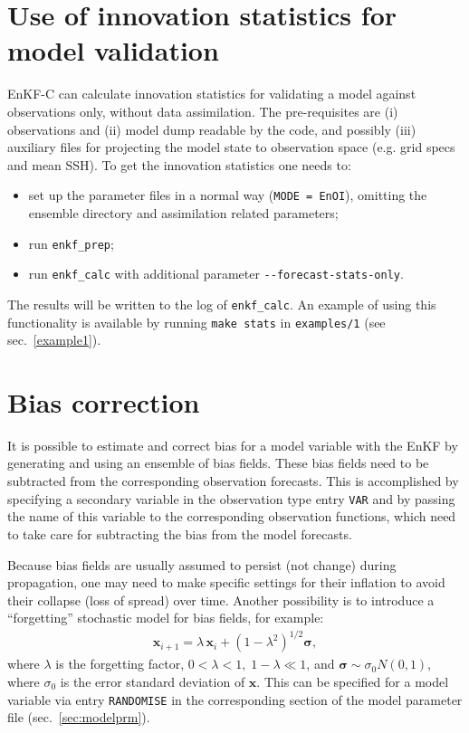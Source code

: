 \documentclass[11pt]{report}
\newcommand{\mb} {\mathbf}
\newcommand{\ms} {\boldsymbol}
\begin{document}
\section{Use of innovation statistics for model validation}

EnKF-C can calculate innovation statistics for validating a model against observations only, without data assimilation.
The pre-requisites are (i) observations and (ii) model dump readable by the code, and possibly (iii) auxiliary files for projecting the model state to observation space (e.g. grid specs and mean SSH).
To get the innovation statistics one needs to:
\begin{itemize}
\item set up the parameter files in a normal way (\verb|MODE = EnOI|), omitting the ensemble directory and assimilation related parameters;
\item run \verb|enkf_prep|;
\item run \verb|enkf_calc| with additional parameter \verb|--forecast-stats-only|.
\end{itemize}
The results will be written to the log of \verb|enkf_calc|. 
An example of using this functionality is available by running \verb|make stats| in \verb|examples/1| (see sec.~\ref{example1}).

\section{Bias correction}
\label{sec:bias}

It is possible to estimate and correct bias for a model variable with the EnKF by generating and using an ensemble of bias fields.
These bias fields need to be subtracted from the corresponding observation forecasts.
This is accomplished by specifying a secondary variable in the observation type entry \verb|VAR| and by passing the name of this variable to the corresponding observation functions, which need to take care for subtracting the bias from the model forecasts.

Because bias fields are usually assumed to persist (not change) during propagation, one may need to make specific settings for their inflation to avoid their collapse (loss of spread) over time.
Another possibility is to introduce a ``forgetting'' stochastic model for bias fields, for example:
\begin{align*}
  \mb x_{i+1} = \lambda \, \mb x_i + (1 - \lambda^2)^{1/2} \ms \sigma,
\end{align*}
where $\lambda$ is the forgetting factor, $0 < \lambda < 1, \; 1 - \lambda \ll 1$, and $\ms \sigma \sim \sigma_0 N(0, 1)$, where $\sigma_0$ is the error standard deviation of $\mb x$.
This can be specified for a model variable via entry \verb|RANDOMISE| in the corresponding section of the model parameter file (sec.~\ref{sec:modelprm}).
\end{document}
